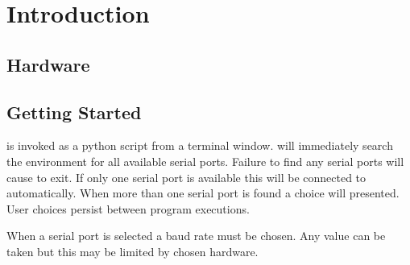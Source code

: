 \section{Introduction}

\subsection{Hardware}

\subsection{Getting Started}
\ds is invoked as a python script from a terminal window.
\ds will immediately search the environment for all available serial ports.
Failure to find any serial ports will cause \ds to exit.
If only one serial port is available this will be connected to automatically.
When more than one serial port is found a choice will presented.
User choices persist between program executions.

When a serial port is selected a baud rate must be chosen.
Any value can be taken  but this may be limited by chosen hardware.

